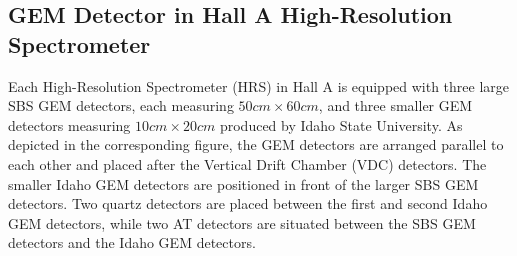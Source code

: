 \subsection{GEM Detector in Hall A High-Resolution Spectrometer}

Each High-Resolution Spectrometer (HRS) in Hall A is equipped with three large SBS GEM detectors, each measuring $50 cm \times 60 cm$, and three smaller GEM detectors measuring $10 cm \times 20 cm$ produced by Idaho State University. As depicted in the corresponding figure, the GEM detectors are arranged parallel to each other and placed after the Vertical Drift Chamber (VDC) detectors. The smaller Idaho GEM detectors are positioned in front of the larger SBS GEM detectors. Two quartz detectors are placed between the first and second Idaho GEM detectors, while two AT detectors are situated between the SBS GEM detectors and the Idaho GEM detectors.


